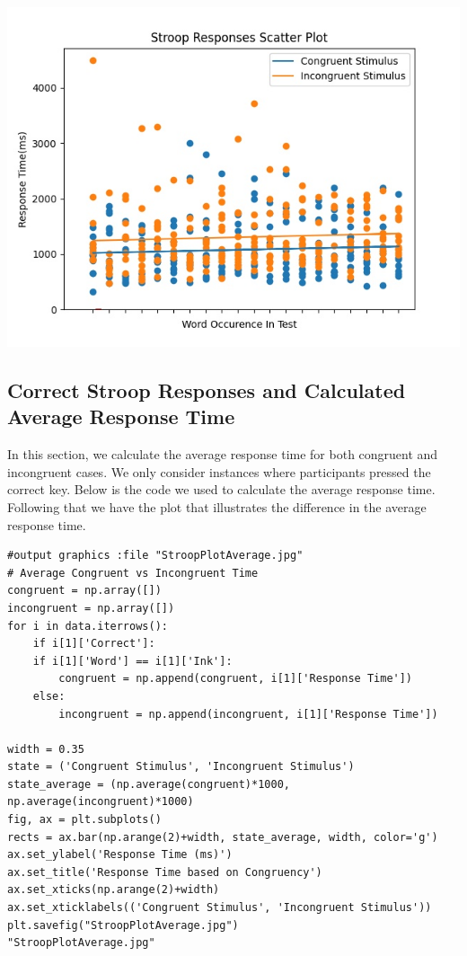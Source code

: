 \documentclass{article}
\begin{document}
\begin{center}
\includegraphics[width=.9\linewidth]{StroopPlotScatter.jpg}
\end{center}

\pagebreak


\subsection{Correct Stroop Responses and Calculated Average Response Time}
\label{sec:org344fae2}

In this section, we calculate the average response time for both congruent and incongruent cases. We only consider instances where participants pressed the correct key. Below is the code we used to calculate the average response time. Following that we have the plot that illustrates the difference in the average response time.

\begin{verbatim}
#output graphics :file "StroopPlotAverage.jpg"
# Average Congruent vs Incongruent Time
congruent = np.array([])
incongruent = np.array([])
for i in data.iterrows():
    if i[1]['Correct']:
	if i[1]['Word'] == i[1]['Ink']:
	    congruent = np.append(congruent, i[1]['Response Time'])
	else:
	    incongruent = np.append(incongruent, i[1]['Response Time'])

width = 0.35
state = ('Congruent Stimulus', 'Incongruent Stimulus')
state_average = (np.average(congruent)*1000, np.average(incongruent)*1000)
fig, ax = plt.subplots()
rects = ax.bar(np.arange(2)+width, state_average, width, color='g')
ax.set_ylabel('Response Time (ms)')
ax.set_title('Response Time based on Congruency')
ax.set_xticks(np.arange(2)+width)
ax.set_xticklabels(('Congruent Stimulus', 'Incongruent Stimulus'))
plt.savefig("StroopPlotAverage.jpg")
"StroopPlotAverage.jpg"
\end{verbatim}
\end{document}
